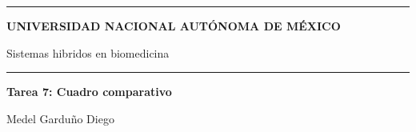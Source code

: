 \documentclass{article}
\begin{document}
\thispagestyle{plain}


\hrule
\begin{center}
    {\Large \textbf{UNIVERSIDAD NACIONAL AUTÓNOMA DE MÉXICO}}
    \vspace{10pt}

    {\Large{{Sistemas hibridos en biomedicina}}}
    
    
    \vspace{10pt}

    \hrule

    \vspace{20pt}


    {\Huge \textbf{Tarea 7: Cuadro comparativo}}\\
\end{center}

\hdashrule{\linewidth}{1pt}{1mm}

\begin{flushright}
    {\small Medel Garduño Diego} 
\end{flushright}
\end{document}
